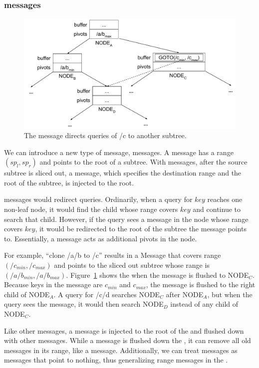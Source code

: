 \subsubsection{\GOTO messages}

\begin{figure}
  \centering
  \includegraphics[width=.9\linewidth]{fig/goto}
  \caption{The \GOTO message directs queries of /c to another subtree.}
  \label{fig:goto}
\end{figure}

We can introduce a new type of message, \GOTO messages.
A \GOTO message has a range $(sp_l, sp_r)$ and points to the root of a subtree.
With \GOTO messages, after the source subtree is sliced out, a
\GOTO message, which specifies the destination range and the root of the
subtree, is injected to the root.

\GOTO messages would redirect queries.
Ordinarily, when a query for $key$ reaches one non-leaf node, it would find the
child whose range covers $key$ and continue to search that child.
However, if the query sees a \GOTO message in the node whose range covers $key$,
it would be redirected to the root of the subtree the \GOTO message points to.
Essentially, a \GOTO message acts as additional pivots in the node.

For example, ``clone /a/b to /c'' results in a \GOTO Message that covers
range $(/c_{min}, /c_{max})$ and points to the sliced out subtree whose range is
$(/a/b_{min}, /a/b_{max})$.
Figure~\ref{fig:goto} shows the \bet when the \GOTO message is flushed to
NODE$_C$.
Because keys in the \GOTO message are $c_{min}$ and $c_{max}$, the message is
flushed to the right child of NODE$_A$.
A query for /c/d searches NODE$_C$ after NODE$_A$, but when the query sees the
\GOTO message, it would then search NODE$_D$ instead of any child of NODE$_C$.

Like other messages, a \GOTO message is injected to the root of the \bet and
flushed down with other messages.
While a \GOTO message is flushed down the \bet, it can remove all old messages
in its range, like a \rd message.
Additionally, we can treat \rd messages as \GOTO messages that point to
nothing, thus generalizing range messages in the \bet.

